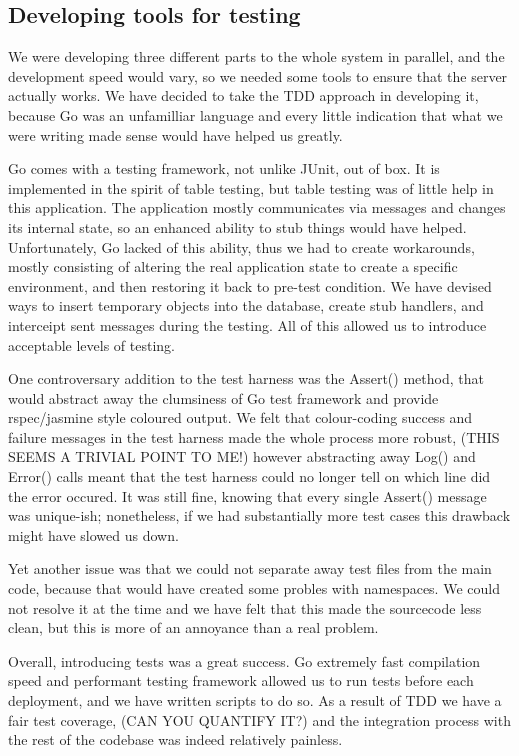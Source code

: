 \documentclass{l3proj}
\begin{document}
\subsection{Developing tools for testing}

We were developing three different parts to the whole system in parallel, and the development speed would vary, so we needed some tools to ensure that the server actually works. We have decided to take the TDD approach in developing it, because Go was an unfamilliar language and every little indication that what we were writing made sense would have helped us greatly.

Go comes with a testing framework, not unlike JUnit, out of box. It is implemented in the spirit of table testing, but table testing was of little help in this application. The application mostly communicates via messages and changes its internal state, so an enhanced ability to stub things would have helped. Unfortunately, Go lacked of this ability, thus we had to create workarounds, mostly consisting of altering the real application state to create a specific environment, and then restoring it back to pre-test condition. We have devised ways to insert temporary objects into the database, create stub handlers, and interceipt sent messages during the testing. All of this allowed us to introduce acceptable levels of testing.

One controversary addition to the test harness was the Assert() method, that would abstract away the clumsiness of Go test framework and provide rspec/jasmine style coloured output. We felt that colour-coding success and failure messages in the test harness made the whole process more robust, (THIS SEEMS A TRIVIAL POINT TO ME!) however abstracting away Log() and Error() calls meant that the test harness could no longer tell on which line did the error occured. It was still fine, knowing that every single Assert() message was unique-ish; nonetheless, if we had substantially more test cases this drawback might have slowed us down.

Yet another issue was that we could not separate away test files from the main code, because that would have created some probles with namespaces. We could not resolve it at the time and we have felt that this made the sourcecode less clean, but this is more of an annoyance than a real problem.

Overall, introducing tests was a great success. Go extremely fast compilation speed and performant testing framework allowed us to run tests before each deployment, and we have written scripts to do so. As a result of TDD we have a fair test coverage, (CAN YOU QUANTIFY IT?) and the integration process with the rest of the codebase was indeed relatively painless.
\end{document}
